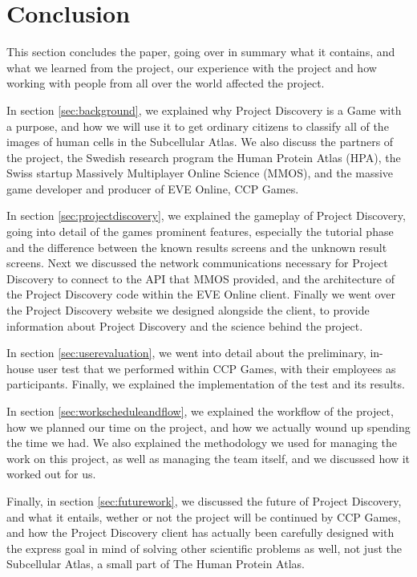 \section{Conclusion}\label{sec:conclusion}

This section concludes the paper, going over in summary what it contains, and what we learned from the project, our experience with the project and how working with people from all over the world affected the project. 

In section \ref{sec:background}, we explained why Project Discovery is a Game with a purpose, and how we will use it to get ordinary citizens to classify all of the images of human cells in the Subcellular Atlas. We also discuss the partners of the project, the Swedish research program the Human Protein Atlas (HPA), the Swiss startup Massively Multiplayer Online Science (MMOS), and the massive game developer and producer of EVE Online, CCP Games.

In section \ref{sec:projectdiscovery}, we explained the gameplay of Project Discovery, going into detail of the games prominent features, especially the tutorial phase and the difference between the known results screens and the unknown result screens. Next we discussed the network communications necessary for Project Discovery to connect to the API that MMOS provided, and the architecture of the Project Discovery code within the EVE Online client. Finally we went over the Project Discovery website we designed alongside the client, to provide information about Project Discovery and the science behind the project.

In section \ref{sec:userevaluation}, we went into detail about the preliminary, in-house user test that we performed within CCP Games, with their employees as participants. Finally, we explained the implementation of the test and its results.

In section \ref{sec:workscheduleandflow}, we explained the workflow of the project, how we planned our time on the project, and how we actually wound up spending the time we had. We also explained the methodology we used for managing the work on this project, as well as managing the team itself, and we discussed how it worked out for us.

Finally, in section \ref{sec:futurework}, we discussed the future of Project Discovery, and what it entails, wether or not the project will be continued by CCP Games, and how the Project Discovery client has actually been carefully designed with the express goal in mind of solving other scientific problems as well, not just the Subcellular Atlas, a small part of The Human Protein Atlas.

